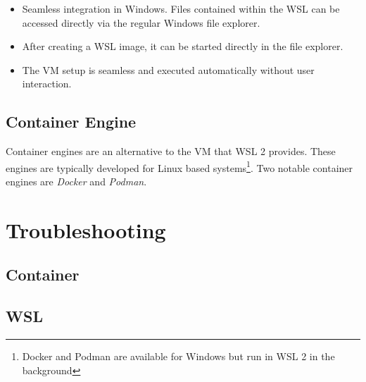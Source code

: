 \begin{itemize}
  \item Seamless integration in Windows.
    Files contained within the WSL can be accessed directly via the regular Windows file explorer.
  \item After creating a WSL image, it can be started directly in the file explorer.
  \item The VM setup is seamless and executed automatically without user
    interaction.
\end{itemize}

\subsection{Container Engine}

Container engines are an alternative to the VM that WSL 2 provides.
These engines are typically developed for Linux based systems\footnote{Docker and Podman are available for Windows but run in WSL 2 in the background}.
Two notable container engines are \emph{Docker} and \emph{Podman}.

\newpage



\newpage



\newpage



\newpage



\newpage

\appendix



\newpage

\section{Troubleshooting}



\subsection{Container}



\subsection{WSL}

